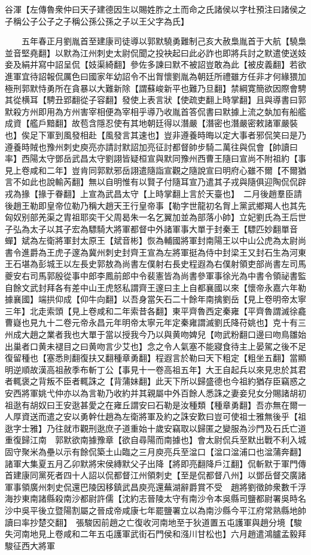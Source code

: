 谷渾【左傳魯衆仲曰天子建德因生以賜姓胙之土而命之氏諸侯以字杜預注曰諸侯之子稱公子公子之子稱公孫公孫之子以王父字為氏】

　　五年春正月劉胤首至建康司徒導以郭默驍勇難制己亥大赦梟胤首于大航【驍梟並音堅堯翻】以默為江州刺史太尉侃聞之投袂起曰此必詐也即將兵討之默遣使送妓妾及絹并寫中詔呈侃【妓渠綺翻】參佐多諫曰默不被詔豈敢為此【被皮義翻】若欲進軍宜待詔報侃厲色曰國家年幼詔令不出胷懷劉胤為朝廷所禮雖方任非才何緣猥加極刑郭默恃勇所在貪暴以大難新除【謂蘇峻新平也難乃旦翻】禁綱寛簡欲因際會騁其從横耳【騁丑郢翻從子容翻】發使上表言狀【使疏吏翻上時掌翻】且與導書曰郭默殺方州即用為方州害宰相便為宰相乎導乃收胤首答侃書曰默據上流之埶加有船艦成資【艦戶黯翻】故苞含隱忍使有其地朝廷得以潛嚴【潛密也潛嚴密敕諸軍嚴裝也】俟足下軍到風發相赴【風發言其速也】豈非遵養時晦以定大事者邪侃笑曰是乃遵養時賊也豫州刺史庾亮亦請討默詔加亮征討都督帥步騎二萬往與侃會【帥讀曰率】西陽太守鄧岳武昌太守劉詡皆疑桓宣與默同豫州西曹王隨曰宣尚不附祖約【事見上卷咸和二年】豈肯同郭默邪岳詡遣隨詣宣觀之隨說宣曰明府心雖不爾【不爾猶言不如此也說輸芮翻】無以自明惟有以賢子付隨耳宣乃遣其子戎與隨俱迎陶侃侃辟戎為掾【掾于眷翻】上宣為武昌太守【上時掌翻上言於天臺也】　二月後趙羣臣請後趙王勒即皇帝位勒乃稱大趙天王行皇帝事【勒字世龍初名胷上黨武鄉羯人也其先匈奴别部羌渠之胄祖耶奕干父周曷朱一名乞翼加並為部落小帥】立妃劉氏為王后世子弘為太子以其子宏為驃騎大將軍都督中外諸軍事大單于封秦王【驃匹妙翻單音蟬】斌為左衛將軍封太原王【斌音彬】恢為輔國將軍封南陽王以中山公虎為太尉尚書令進爵為王虎子邃為冀州刺史封齊王宣為左將軍挺為侍中封梁王又封石生為河東王石堪為彭城王以左長史郭敖為尚書左僕射右長史程遐為右僕射領吏部尚書左司馬夔安右司馬郭殷從事中郎李鳳前郎中令裴憲皆為尚書參軍事徐光為中書令領祕書監自餘文武封拜各有差中山王虎怒私謂齊王邃曰主上自都襄國以來【懷帝永嘉六年勒據襄國】端拱仰成【仰牛向翻】以吾身當矢石二十餘年南擒劉岳【見上卷明帝太寧三年】北走索頭【見上卷咸和二年索昔各翻】東平齊魯西定秦雍【平齊魯謂滅徐龕曹嶷也見九十二卷元帝永昌元年明帝太寧元年定秦雍謂滅劉氏降苻姚也】克十有三州成大趙之業者我也大單于當以授我今乃以與黄吻婢兒【吻武粉翻口邊曰吻鳥雛始出巢者口黄未褪目之曰黄吻言少艾也】念之令人氣塞不能寢食待主上晏駕之後不足復留種也【塞悉則翻復扶又翻種章勇翻】程遐言於勒曰天下粗定【粗坐五翻】當顯明逆順故漢高祖赦季布斬丁公【事見十一卷高祖五年】大王自起兵以來見忠於其君者輒褒之背叛不臣者輒誅之【背蒲妹翻】此天下所以歸盛德也今祖約猶存臣竊惑之安西將軍姚弋仲亦以為言勒乃收約并其親屬中外百餘人悉誅之妻妾兒女分賜諸胡初祖逖有胡奴曰王安逖甚愛之在雍丘謂安曰石勒是汝種類【種章勇翻】吾亦無在爾一人厚資送而遣之安以勇幹仕趙為左衛將軍及約之誅安歎曰豈可使祖士雅無後乎【祖逖字士雅】乃往就市觀刑逖庶子道重始十歲安竊取以歸匿之變服為沙門及石氏亡道重復歸江南　郭默欲南據豫章【欲自尋陽而南據也】會太尉侃兵至默出戰不利入城固守聚米為壘以示有餘侃築土山臨之三月庾亮兵至湓口【湓口湓浦口也湓蒲奔翻】諸軍大集夏五月乙卯默將宋侯縳默父子出降【將即亮翻降戶江翻】侃斬默于軍門傳首建康同黨死者四十人詔以侃都督江州領刺史【至是侃都督八州】以鄧岳督交廣諸軍事領廣州刺史侃還巴陵因移鎮武昌庾亮還蕪湖辭爵賞不受　趙將劉徵帥衆數千浮海抄東南諸縣殺南沙都尉許儒【沈約志晉陵太守有南沙令本吳縣司鹽都尉署吳時名沙中吳平後立暨陽割屬之晉成帝咸康七年罷鹽署立以為南沙縣今平江府常熟縣地帥讀曰率抄楚交翻】　張駿因前趙之亡復收河南地至于狄道置五屯護軍與趙分境【駿失河南地見上卷咸和二年五屯護軍武街石門侯和漒川甘松也】六月趙遣鴻臚孟毅拜駿征西大將軍